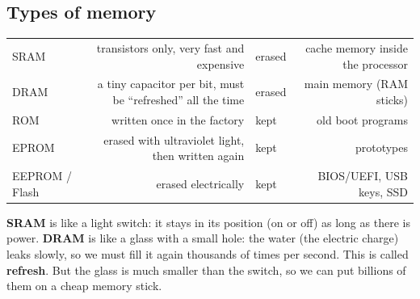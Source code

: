 \subsection{Types of memory}
\begin{center}
\end{center}

\begin{center}
\small
\begin{tabularx}{\linewidth}{|>{\centering\arraybackslash}p{2.2cm}|R|>{\centering\arraybackslash}p{2.4cm}|R|}
    \hline
     &  &  &  \\ \hline
    SRAM & transistors only, very fast and expensive & erased & cache memory inside the processor \\ \hline
    DRAM & a tiny capacitor per bit, must be ``refreshed'' all the time & erased & main memory (RAM sticks) \\ \hline
    ROM  & written once in the factory & kept & old boot programs \\ \hline
    EPROM & erased with ultraviolet light, then written again & kept & prototypes \\ \hline
    EEPROM / Flash & erased electrically & kept & BIOS/UEFI, USB keys, SSD \\ \hline
\end{tabularx}
\end{center}

\begin{tashbih}
    \textbf{SRAM} is like a light switch: it stays in its position (on or off) as long as there is power.
    \textbf{DRAM} is like a glass with a small hole: the water (the electric charge) leaks slowly, so we must
    fill it again thousands of times per second. This is called \textbf{refresh}. But the glass is much
    smaller than the switch, so we can put billions of them on a cheap memory stick.
\end{tashbih}

